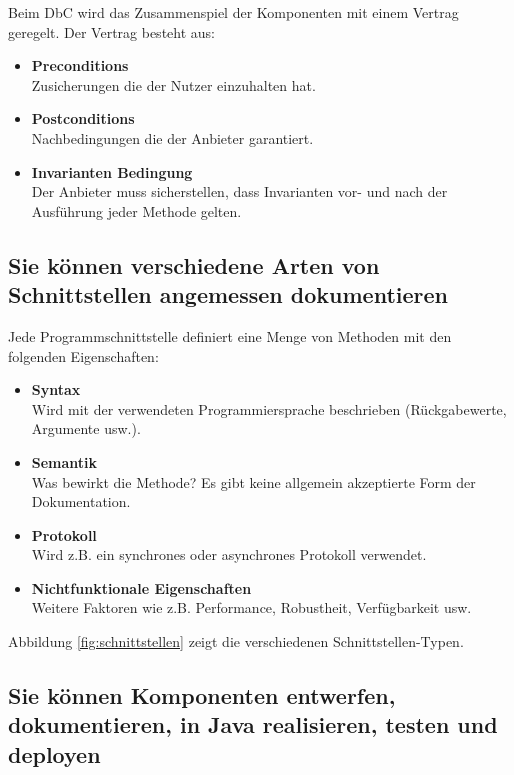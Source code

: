 Beim \ac{DbC} wird das Zusammenspiel der Komponenten mit einem Vertrag geregelt. Der Vertrag besteht aus:

\begin{itemize}
	\item \textbf{Preconditions} \\
		  Zusicherungen die der Nutzer einzuhalten hat.
	\item \textbf{Postconditions} \\
		  Nachbedingungen die der Anbieter garantiert.
	\item \textbf{Invarianten Bedingung} \\ 
		  Der Anbieter muss sicherstellen, dass Invarianten vor- und nach der Ausführung jeder Methode gelten.
\end{itemize}

\subsection{Sie können verschiedene Arten von Schnittstellen angemessen dokumentieren}

Jede Programmschnittstelle definiert eine Menge von Methoden mit den folgenden Eigenschaften:

\begin{itemize}
	\item \textbf{Syntax} \\
		  Wird mit der verwendeten Programmiersprache beschrieben (Rückgabewerte, Argumente usw.).
	\item \textbf{Semantik} \\
		  Was bewirkt die Methode? Es gibt keine allgemein akzeptierte Form der Dokumentation.
	\item \textbf{Protokoll} \\
		  Wird z.B. ein synchrones oder asynchrones Protokoll verwendet.
	\item \textbf{Nichtfunktionale Eigenschaften} \\
		  Weitere Faktoren wie z.B. Performance, Robustheit, Verfügbarkeit usw.
\end{itemize}

Abbildung \ref{fig:schnittstellen} zeigt die verschiedenen Schnittstellen-Typen.


\newpage

\subsection{Sie können Komponenten entwerfen, dokumentieren, in Java realisieren, testen und deployen}


